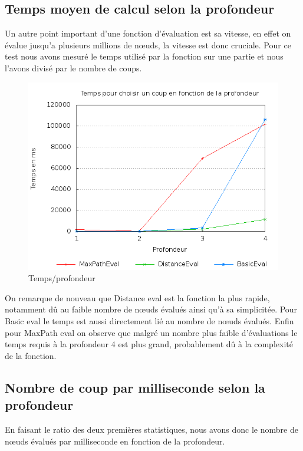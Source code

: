 	\newpage
	\subsection{Temps moyen de calcul selon la profondeur}
	
		Un autre point important d'une fonction d'évaluation est sa vitesse,
		en effet on évalue jusqu'a plusieurs millions de n\oe{}uds, la vitesse
		est donc cruciale.
		Pour ce test nous avons mesuré le temps utilisé par la fonction sur une
		partie et nous l'avons divisé par le nombre de coups.
	
		\begin{figure}[h!]
			\centering
			\includegraphics[width=\textwidth]{images/timeDepth.png}
			\caption{Temps/profondeur}
			\label{fig:stats_time_depth}
		\end{figure}
		
		On remarque de nouveau que Distance eval est la fonction la plus
		rapide, notamment dû au faible nombre de n\oe{}uds évalués ainsi
		qu'à sa simplicitée.
		Pour Basic eval le temps est aussi directement lié au nombre de
		n\oe{}uds évalués.
		Enfin pour MaxPath eval on observe que malgré un nombre plus faible
		d'évaluations le temps requis à la profondeur 4 est plus grand,
		probablement dû à la complexité de la fonction.
	
	\newpage
	\subsection{Nombre de coup par milliseconde selon la profondeur}
	
		En faisant le ratio des deux premières statistiques, nous avons
		donc le nombre de n\oe{}uds évalués par milliseconde en fonction de la profondeur.
	
